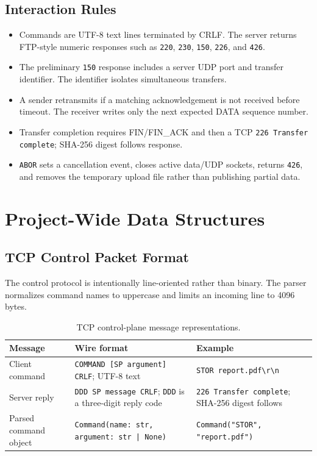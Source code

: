 \documentclass[11pt,a4paper]{article}
\newcommand{\code}[1]{\texttt{#1}}
\begin{document}
\subsection{Interaction Rules}

\begin{itemize}
  \item Commands are UTF-8 text lines terminated by CRLF. The server returns FTP-style numeric responses such as \code{220}, \code{230}, \code{150}, \code{226}, and \code{426}.
  \item The preliminary \code{150} response includes a server UDP port and transfer identifier. The identifier isolates simultaneous transfers.
  \item A sender retransmits if a matching acknowledgement is not received before timeout. The receiver writes only the next expected DATA sequence number.
  \item Transfer completion requires FIN/FIN\_ACK and then a TCP \code{226 Transfer complete}; SHA-256 digest follows response.
  \item \code{ABOR} sets a cancellation event, closes active data/UDP sockets, returns \code{426}, and removes the temporary upload file rather than publishing partial data.
\end{itemize}

\section{Project-Wide Data Structures}

\subsection{TCP Control Packet Format}

The control protocol is intentionally line-oriented rather than binary. The parser normalizes command names to uppercase and limits an incoming line to 4096 bytes.

\begin{table}[htbp]
\centering
\begin{tabularx}{\textwidth}{@{}P{37mm}Y Y@{}}
\toprule
\textbf{Message} & \textbf{Wire format} & \textbf{Example} \\
\midrule
Client command & \code{COMMAND [SP argument] CRLF}; UTF-8 text & \code{STOR report.pdf\textbackslash r\textbackslash n} \\
Server reply & \code{DDD SP message CRLF}; \code{DDD} is a three-digit reply code & \code{226 Transfer complete}; SHA-256 digest follows \\
Parsed command object & \code{Command(name: str, argument: str | None)} & \code{Command("STOR", "report.pdf")} \\
\bottomrule
\end{tabularx}
\caption{TCP control-plane message representations.}
\end{table}
\end{document}
